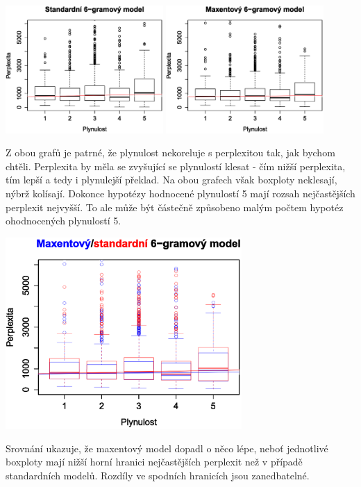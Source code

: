 \documentclass[12pt,a4paper]{report}
\begin{document}
\begin{center}
	\includegraphics[width=60mm]{./grafy/morf/ngram/text.svg.eps}
	\includegraphics[width=60mm]{./grafy/morf/maxent/text.svg.eps}
\end{center}
Z obou grafů je patrné, že plynulost nekoreluje s perplexitou tak, jak bychom chtěli. Perplexita by měla se zvyšující se plynulostí klesat - čím nižší perplexita, tím lepší a tedy i plynulejší překlad. Na obou grafech však boxploty neklesají, nýbrž kolísají. Dokonce hypotézy hodnocené plynulostí 5 mají rozsah nejčastějších perplexit nejvyšší. To ale může být částečně způsobeno malým počtem hypotéz ohodnocených plynulostí 5.

\begin{center}
	\includegraphics[width=90mm]{./grafy/morf/porovnani/text.svg.eps}
\end{center}
Srovnání ukazuje, že maxentový model dopadl o něco lépe, neboť jednotlivé boxploty mají nižší horní hranici nejčastějších perplexit než v případě standardních modelů. Rozdíly ve spodních hranicích jsou zanedbatelné.
\end{document}
